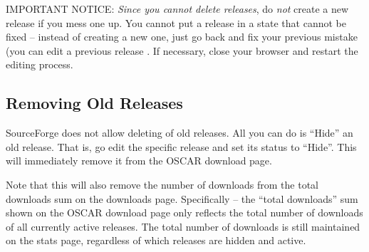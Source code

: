 {\large IMPORTANT NOTICE}: {\em Since you cannot delete releases}, do
{\em not} create a new release if you mess one up.  You cannot put a
release in a state that cannot be fixed -- instead of creating a new
one, just go back and fix your previous mistake (you can edit a
previous release .  If necessary, close
your browser and restart the editing process.


\subsection{Removing Old Releases}

SourceForge does not allow deleting of old releases.  All you can do
is ``Hide'' an old release.  That is, go edit the specific release and
set its status to ``Hide''.  This will immediately remove it from the
OSCAR download page.

Note that this will also remove the number of downloads from the total
downloads sum on the downloads page.  Specifically -- the ``total
downloads'' sum shown on the OSCAR download page only reflects the
total number of downloads of all currently active releases.  The total
number of downloads is still maintained on the stats page, regardless
of which releases are hidden and active.

